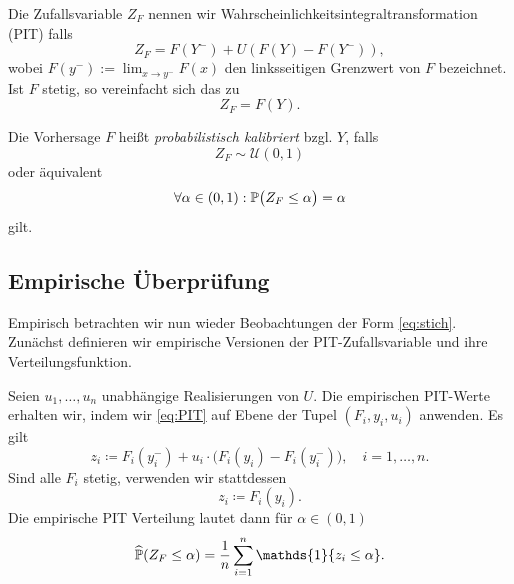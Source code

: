 \begin{defi}
Die Zufallsvariable $Z_F$ nennen wir Wahrscheinlichkeitsintegraltransformation (PIT) falls
\begin{equation}\label{eq:PIT}
Z_F=F(Y^-)+U(F(Y)-F(Y^-)),
\end{equation}{}wobei $F(y^-) := \lim_{x \rightarrow y^-} F(x)$ den linksseitigen Grenzwert von $F$ bezeichnet. Ist $F$ stetig, so vereinfacht sich das zu
\[
Z_F = F(Y).
\]
\end{defi}{}

\begin{defi}
Die Vorhersage $F$ heißt \emph{probabilistisch kalibriert} bzgl. $Y$, falls
\begin{equation}\label{eq:PK1}
    Z_F \sim \mathcal{U}(0, 1) 
\end{equation}{}
oder äquivalent
\begin{equation}\label{eq:PK2}
\forall \alpha \in (0,1): \mathbb{P}\big(Z_F \leq \alpha \big) = \alpha
\end{equation}{}
gilt.
\end{defi}{}

\subsection{Empirische Überprüfung}
Empirisch betrachten wir nun wieder Beobachtungen der Form \eqref{eq:stich}. Zunächst definieren wir empirische Versionen der PIT-Zufallsvariable und ihre Verteilungsfunktion.

\begin{defi} Seien $u_1,\dotsc,u_n$ unabhängige Realisierungen von $U$.
Die empirischen PIT-Werte erhalten wir, indem wir \eqref{eq:PIT} auf Ebene der Tupel $(F_i,y_i,u_i)$ anwenden. Es gilt
    \[
        z_i \coloneqq F_i(y_i^-) + u_i \cdot \bigl(F_i(y_i) - F_i(y_i^-)\bigr), \quad i = 1,\dots,n.
    \]
    Sind alle $F_i$ stetig, verwenden wir stattdessen
    \[
        z_i \coloneqq F_i(y_i).
    \]
    Die empirische PIT Verteilung lautet dann für $\alpha \in (0,1)$
    \begin{equation} \label{eq:emp_pit_dist}
        \widehat{\PW}(Z_F \leq \alpha) = \frac{1}{n}\sum_{i=1}^{n}\mathds{1}\{z_i\leq \alpha\}.
    \end{equation}
\end{defi}{}

